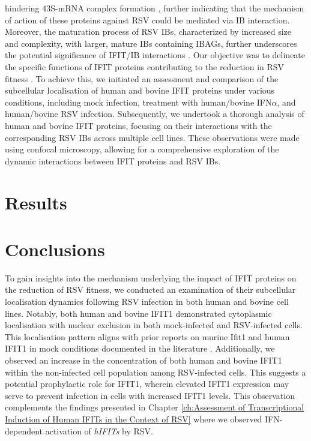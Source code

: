 hindering 43S-mRNA complex formation \cite{Diamond2014IFIT1:Translation, Guo2000CharacterizationVirus}, further indicating that the mechanism of action of these proteins against RSV could be mediated via IB interaction. Moreover, the maturation process of RSV IBs, characterized by increased size and complexity, with larger, mature IBs containing IBAGs, further underscores the potential significance of IFIT/IB interactions \cite{Rincheval2017FunctionalVirus, Jobe2021BovineResponses}. Our objective was to delineate the specific functions of IFIT proteins contributing to the reduction in RSV fitness \cite{Drori2020InfluenzaProteins}. To achieve this, we initiated an assessment and comparison of the subcellular localisation of human and bovine IFIT proteins under various conditions, including mock infection, treatment with human/bovine IFN\(\alpha\), and human/bovine RSV infection. Subsequently, we undertook a thorough analysis of human and bovine IFIT proteins, focusing on their interactions with the corresponding RSV IBs across multiple cell lines. These observations were made using confocal microscopy, allowing for a comprehensive exploration of the dynamic interactions between IFIT proteins and RSV IBs.

\section{Results} \label{sec:Results-Chapter3}



\section{Conclusions} \label{sec:Conclusions-Chapter3}
To gain insights into the mechanism underlying the impact of IFIT proteins on the reduction of RSV fitness, we conducted an examination of their subcellular localisation dynamics following RSV infection in both human and bovine cell lines. Notably, both human and bovine IFIT1 demonstrated cytoplasmic localisation with nuclear exclusion in both mock-infected and RSV-infected cells. This localisation pattern aligns with prior reports on murine Ifit1 and human IFIT1 in mock conditions documented in the literature \cite{Pichlmair2011IFIT1RNA, Terenzi2008Interferon-inducibleE1, Thul2017AProteome}. Additionally, we observed an increase in the concentration of both human and bovine IFIT1 within the non-infected cell population among RSV-infected cells. This suggests a potential prophylactic role for IFIT1, wherein elevated IFIT1 expression may serve to prevent infection in cells with increased IFIT1 levels. This observation complements the findings presented in Chapter \ref{ch:Assessment of Transcriptional Induction of Human IFITs in the Context of RSV} where we observed IFN-dependent activation of \textit{hIFITs} by RSV.

